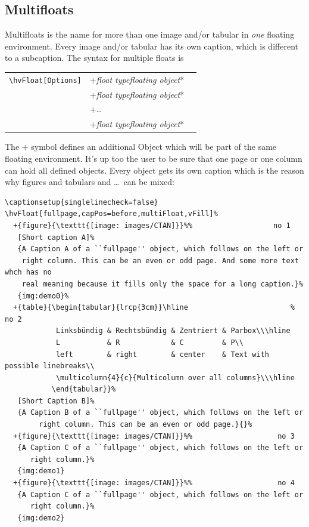 \documentclass[twoside,paper=a4,usegeometry]{scrartcl}
\makeatletter
\def\Lcs#1{\texttt{\textbackslash#1}\index{#1@\texttt{\textbackslash#1}}}
\newenvironment{BDef}
  {\begin{lrbox}{\boxdef}
      \def\arraystretch{1.0}
      \begin{tabular}{@{}l@{}l@{}l@{}}}
  {\end{tabular}\end{lrbox}
%
%
   {\BCmd\fbox{\usebox\boxdef}\endBCmd}
   \aftergroup\@afterindentfalse\aftergroup\@afterheading
  }
\def\OptArgs{\colorbox{black!20}{\texttt{[Options]}}\kern1pt}
\def\OptArg{\@ifnextchar*\OptArg@i{\OptArg@ii*}}%
\def\OptArg@i*#1{\colorbox{black!20}{\texttt{#1}}\kern1pt}
\def\OptArg@ii*#1{\colorbox{black!20}{\texttt{[#1]}}\kern1pt}
\newcommand\Larg [1]{{\normalfont\itshape#1\/}}
\newcommand\Largb[1]{\lcb\Larg{#1}\rcb}          %
\DeclareRobustCommand\lcb{{\normalfont\ttfamily\textbraceleft}}
\DeclareRobustCommand\rcb{{\normalfont\ttfamily\textbraceright}}
\makeatother
\begin{document}
\FloatBarrier


\clearpage


\subsection{Multifloats}\label{sec:multifloats}
Multifloats is the name for more than one image and/or tabular in \emph{one} floating
environment. Every image and/or tabular has its own caption, which is different to
a subcaption. The syntax for multiple floats is

\begin{BDef}
\Lcs{hvFloat}\OptArgs&+\Largb{float type}\Largb{floating object}\OptArg{short caption}\Largb{long caption}\Largb{label}\\
&+\Largb{float type}\Largb{floating object}\OptArg{short caption}\Largb{long caption}\Largb{label}\\
&+\ldots\\
&+\Largb{float type}\Largb{floating object}\OptArg{short caption}\Largb{long caption}\Largb{label}
\end{BDef}

The + symbol defines an additional Object which will be part of the same floating environment.
It's up too the user to be sure that one page or one column can hold all defined objects.
Every object gets its own caption which is the reason why figures and tabulars and \ldots\ 
can be mixed:

\begin{lstlisting}
\captionsetup{singlelinecheck=false}
\hvFloat[fullpage,capPos=before,multiFloat,vFill]%
  +{figure}{\texttt{[image: images/CTAN]}}%%                   no 1
   [Short caption A]%
   {A Caption A of a ``fullpage'' object, which follows on the left or
    right column. This can be an even or odd page. And some more text whch has no
    real meaning because it fills only the space for a long caption.}%
   {img:demo0}%
  +{table}{\begin{tabular}{lrcp{3cm}}\hline                        %             no 2
            Linksbündig & Rechtsbündig & Zentriert & Parbox\\\hline
            L           & R            & C         & P\\
            left        & right        & center    & Text with possible linebreaks\\
            \multicolumn{4}{c}{Multicolumn over all columns}\\\hline
           \end{tabular}}%
   [Short Caption B]%
   {A Caption B of a ``fullpage'' object, which follows on the left or
        right column. This can be an even or odd page.}{}%
  +{figure}{\texttt{[image: images/CTAN]}}%%                    no 3
   {A Caption C of a ``fullpage'' object, which follows on the left or
      right column.}%
   {img:demo1}
  +{figure}{\texttt{[image: images/CTAN]}}%%                    no 4
   {A Caption C of a ``fullpage'' object, which follows on the left or
      right column.}%
   {img:demo2}
\end{lstlisting}
\end{document}
